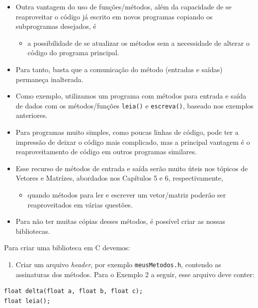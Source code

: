 \documentclass[12pt,a4paper]{article}
\providecommand{\tightlist}{%
      \setlength{\itemsep}{0pt}\setlength{\parskip}{0pt}}
\begin{document}
    \begin{itemize}
\item
  Outra vantagem do uso de funções/métodos, além da capacidade de se
  reaproveitar o código já escrito em novos programas copiando os
  subprogramas desejados, é

  \begin{itemize}
  \tightlist
  \item
    a possibilidade de se atualizar os métodos sem a necessidade de
    alterar o código do programa principal.
  \end{itemize}
\item
  Para tanto, basta que a comunicação do método (entradas e saídas)
  permaneça inalterada.
\item
  Como exemplo, utilizamos um programa com métodos para entrada e saída
  de dados com os métodos/funções \texttt{leia()} e \texttt{escreva()},
  baseado nos exemplos anteriores.
\item
  Para programas muito simples, como poucas linhas de código, pode ter a
  impressão de deixar o código mais complicado, mas a principal vantagem
  é o reaproveitamento de código em outros programas similares.
\item
  Esse recurso de métodos de entrada e saída serão muito úteis nos
  tópicos de Vetores e Matrízes, abordados nos Capítulos 5 e 6,
  respectivamente,

  \begin{itemize}
  \tightlist
  \item
    quando métodos para ler e escrever um vetor/matriz poderão ser
    reaproveitados em várias questões.
  \end{itemize}
\item
  Para não ter muitas cópias desses métodos, é possível criar as nossas
  bibliotecas.
\end{itemize}

    Para criar uma biblioteca em C devemos:

\begin{enumerate}
\def\labelenumi{\arabic{enumi}.}
\tightlist
\item
  Criar um arquivo \emph{header}, por exemplo \texttt{meusMetodos.h},
  contendo as assinaturas dos métodos. Para o Exemplo 2 a seguir, esse
  arquivo deve conter:
\end{enumerate}

\begin{verbatim}
float delta(float a, float b, float c);
float leia();
\end{verbatim}
\end{document}
